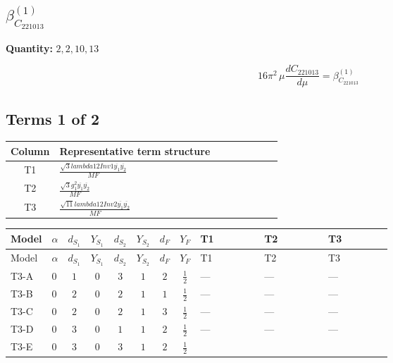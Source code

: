 \documentclass[8pt]{article}
\begin{document}
\begin{landscape}
\section*{$\beta_{C_{221013}}^{(1)}$}
\noindent\textbf{Quantity: }$\mathrm{2,2,10,13}$\par\smallskip
\[16\pi^2\,\mu\frac{d C_{221013}}{d\mu}=\beta_{C_{221013}}^{(1)}\]
\subsection*{Terms 1 of 2}
\begin{center}
\begin{tabular}{@{}c >{\raggedright\arraybackslash}p{0.82\linewidth}@{}}
\toprule
Column & Representative term structure \\
\midrule
T1 & \(\displaystyle \frac{\sqrt{3} lambda12Inv1 \overline{y_{1}} \overline{y_{2}}}{MF}\) \\
\midrule
T2 & \(\displaystyle \frac{\sqrt{3} g_{1}^{2} \overline{y_{1}} \overline{y_{2}}}{MF}\) \\
\midrule
T3 & \(\displaystyle \frac{\sqrt{11} lambda12Inv2 \overline{y_{1}} \overline{y_{2}}}{MF}\) \\
\midrule
\bottomrule
\end{tabular}
\end{center}
\smallskip
\tiny
\begin{longtable}{@{}llcccccc >{\raggedright\arraybackslash}p{0.21\linewidth} >{\raggedright\arraybackslash}p{0.21\linewidth} >{\raggedright\arraybackslash}p{0.21\linewidth}@{}}
\toprule
Model & $\alpha$ & $d_{S_1}$ & $Y_{S_1}$ & $d_{S_2}$ & $Y_{S_2}$ & $d_F$ & $Y_F$ & T1 & T2 & T3 \\
\midrule
\endfirsthead
\toprule
Model & $\alpha$ & $d_{S_1}$ & $Y_{S_1}$ & $d_{S_2}$ & $Y_{S_2}$ & $d_F$ & $Y_F$ & T1 & T2 & T3 \\
\midrule
\endhead
T3-A & $0$ & $1$ & $0$ & $3$ & $1$ & $2$ & $\frac{1}{2}$ & --- & --- & --- \\
\midrule
T3-B & $0$ & $2$ & $0$ & $2$ & $1$ & $1$ & $\frac{1}{2}$ & --- & --- & --- \\
\midrule
T3-C & $0$ & $2$ & $0$ & $2$ & $1$ & $3$ & $\frac{1}{2}$ & --- & --- & --- \\
\midrule
T3-D & $0$ & $3$ & $0$ & $1$ & $1$ & $2$ & $\frac{1}{2}$ & --- & --- & --- \\
\midrule
T3-E & $0$ & $3$ & $0$ & $3$ & $1$ & $2$ & $\frac{1}{2}$ & \scriptsize\adjustbox{max width=\linewidth}{$\begin{gathered} - \frac{\sqrt{3} lambda12Inv1 \overline{y_{1}} \overline{y_{2}}}{6 MF}\end{gathered}$} & \scriptsize\adjustbox{max width=\linewidth}{$\begin{gathered} \frac{\sqrt{3} g_{1}^{2} \overline{y_{1}} \overline{y_{2}}}{8 MF}\end{gathered}$} & \scriptsize\adjustbox{max width=\linewidth}{$\begin{gathered} \frac{3 \sqrt{11} lambda12Inv2 \overline{y_{1}} \overline{y_{2}}}{22 MF}\end{gathered}$} \\

\end{longtable}
\end{landscape}
\end{document}
